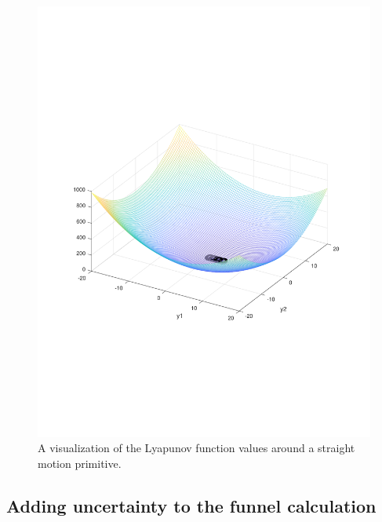 \begin{figure}
  \centering
  \includegraphics[scale=.3]{figures/rrtfunnel/straight-funnel-lyapunov-3d}
  \caption{A visualization of the Lyapunov function values around a straight
    motion primitive.}
  \label{fig:visualized-lyapunov}
\end{figure}

\subsection{Adding uncertainty to the funnel calculation}
\label{sec:adding-uncertainty}

